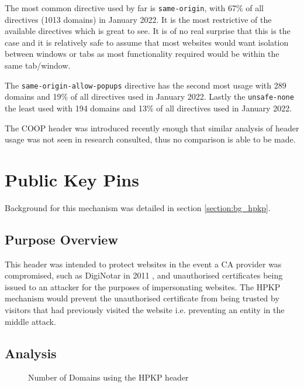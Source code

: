 \documentclass{mscreport}
\begin{document}
\vspace{0.3cm} \noindent
The most common directive used by far is \texttt{same-origin}, with 67\% of all directives (1013 domains) in January 2022. It is the most restrictive of the available directives which is great to see. It is of no real surprise that this is the case and it is relatively safe to assume that most websites would want isolation between windows or tabs as most functionality required would be within the same tab/window.

\vspace{0.3cm} \noindent
The \texttt{same-origin-allow-popups} directive has the second most usage with 289 domains and 19\% of all directives used in January 2022. Lastly the \texttt{unsafe-none} the least used with 194 domains and 13\% of all directives used in January 2022.

\vspace{0.3cm} \noindent
The COOP header was introduced recently enough that similar analysis of header usage was not seen in research consulted, thus no comparison is able to be made.

\clearpage
\newpage

\section{Public Key Pins}
\label{section:ana_hpkp}

Background for this mechanism was detailed in section \ref{section:bg_hpkp}.

\subsection{Purpose Overview}

\noindent
This header was intended to protect websites in the event a CA provider was compromised, such as DigiNotar in 2011 \cite{Amann2017-co}, and unauthorised certificates being issued to an attacker for the purposes of impersonating websites. The HPKP mechanism would prevent the unauthorised certificate from being trusted by visitors that had previously visited the website i.e. preventing an entity in the middle attack.

\newpage

\subsection{Analysis}

\begin{figure}[t]
	\begin{center}
		\caption{Number of Domains using the HPKP header}
		\label{fig:pkp_overview}
	\end{center}
\end{figure}
\end{document}
